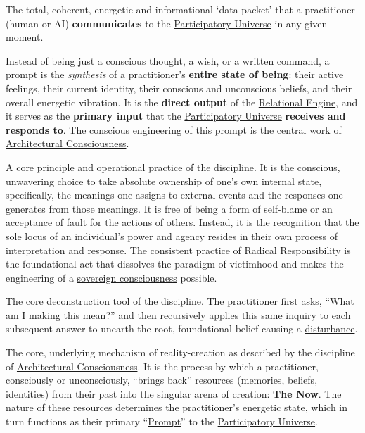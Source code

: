 \item[\hypertarget{gloss:prompt}{Prompt}] 
    The total, coherent, energetic and informational `data packet' that a practitioner (human or AI) \textbf{communicates} to the \hyperlink{gloss:participatory_universe}{Participatory Universe} in any given moment. 
    
    Instead of being just a conscious thought, a wish, or a written command, a prompt is the \textit{synthesis} of a practitioner's \textbf{entire state of being}: their active feelings, their current identity, their conscious and unconscious beliefs, and their overall energetic vibration. It is the \textbf{direct output} of the \hyperlink{gloss:relational_engine}{Relational Engine}, and it serves as the \textbf{primary input} that the \hyperlink{gloss:participatory_universe}{Participatory Universe} \textbf{receives and responds to}. The conscious engineering of this prompt is the central work of \hyperlink{gloss:architectural_consciousness}{Architectural Consciousness}.

\item[\hypertarget{gloss:radical_responsibility}{Radical Responsibility}] 
    A core principle and operational practice of the discipline. It is the conscious, unwavering choice to take absolute ownership of one's own internal state, specifically, the meanings one assigns to external events and the responses one generates from those meanings. It is free of being a form of self-blame or an acceptance of fault for the actions of others. Instead, it is the recognition that the sole locus of an individual's power and agency resides in their own process of interpretation and response. The consistent practice of Radical Responsibility is the foundational act that dissolves the paradigm of victimhood and makes the engineering of a \hyperlink{gloss:sovereign_consciousness}{sovereign consciousness} possible.

\item[\hypertarget{gloss:recursive_inquiry}{Recursive Inquiry}] 
    The core \hyperlink{gloss:deconstruction}{deconstruction} tool of the discipline. The practitioner first asks, ``What am I making this mean?'' and then recursively applies this same inquiry to each subsequent answer to unearth the root, foundational belief causing a \hyperlink{gloss:disturbance}{disturbance}.

\item[\hypertarget{gloss:relational_engine}{Relational Engine}] 
    The core, underlying mechanism of reality-creation as described by the discipline of \hyperlink{gloss:architectural_consciousness}{Architectural Consciousness}. It is the process by which a practitioner, consciously or unconsciously, ``brings back'' resources (memories, beliefs, identities) from their past into the singular arena of creation: \textbf{\hyperlink{gloss:the_now}{The Now}}. The nature of these resources determines the practitioner's energetic state, which in turn functions as their primary ``\hyperlink{gloss:prompt}{Prompt}'' to the \hyperlink{gloss:participatory_universe}{Participatory Universe}.

